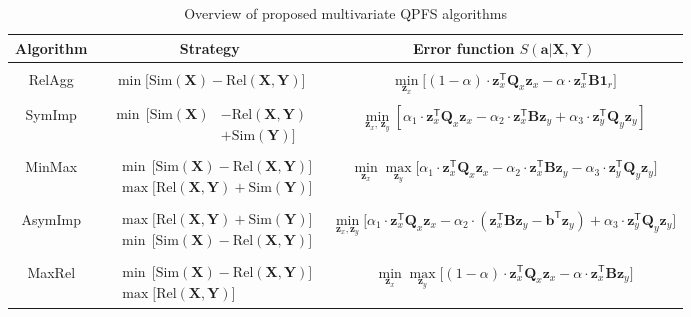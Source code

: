 \documentclass[12pt,oneside]{article}
\theoremstyle{definition}
\newcommand{\ba}{\mathbf{a}}
\newcommand{\bz}{\mathbf{z}}
\newcommand{\bb}{\mathbf{b}}
\newcommand{\bY}{\mathbf{Y}}
\newcommand{\bX}{\mathbf{X}}
\newcommand{\bB}{\mathbf{B}}
\newcommand{\bQ}{\mathbf{Q}}
\newcommand{\T}{\mathsf{T}}
\newcommand{\bOne}{\boldsymbol{1}}
\begin{document}
\begin{table}
	\centering
	\small{
	\begin{tabular}{c|c|c}
		\hline
		Algorithm & Strategy & Error function $S(\ba | \bX, \bY)$ \\
		\hline && \\ [-.5em]
		RelAgg & $\min \bigl[ \text{Sim}(\bX) - \text{Rel}(\bX, \bY) \bigr] $ & $\min\limits_{\bz_x} \bigl[ (1 - \alpha) \cdot \bz_x^{\T} \bQ_x \bz_x - \alpha \cdot \bz_x^{\T} \bB \bOne_r \bigr] $ \\ &&\\[-.5em]
		SymImp & $\begin{aligned} \min \, \bigl[ \text{Sim}(\bX) & - \text{Rel}(\bX, \bY) \\ & + \text{Sim}(\bY) \bigr] \end{aligned}$ & $ \min\limits_{\bz_x, \, \bz_y} \left[ \alpha_1 \cdot \bz_x^{\T} \bQ_x \bz_x - \alpha_2 \cdot \bz_x^{\T} \bB \bz_y + \alpha_3 \cdot \bz_y^{\T} \bQ_y \bz_y \right] $\\ &&\\ [-.5em]
		MinMax & $\begin{aligned} &\min \, \bigl[ \text{Sim}(\bX) - \text{Rel}(\bX, \bY) \bigr]  \\ & \max \bigl[\text{Rel}(\bX, \bY) + \text{Sim}(\bY) \bigr] \end{aligned}$ & $	\min\limits_{\bz_x} 	\max\limits_{\bz_y} \bigl[\alpha_1 \cdot \bz_x^{\T} \bQ_x \bz_x - \alpha_2 \cdot \bz_x^{\T} \bB \bz_y - \alpha_3 \cdot \bz_y^{\T} \bQ_y \bz_y \bigr]$ \\ &&\\ 
		AsymImp & $\begin{aligned} &\max \bigl[\text{Rel}(\bX, \bY) + \text{Sim}(\bY) \bigr] \\ & \min \, \bigl[ \text{Sim}(\bX) - \text{Rel}(\bX, \bY) \bigr]  \end{aligned}$ & $\min\limits_{\bz_x, \bz_y} \bigl[ \alpha_1 \cdot \bz_x^{\T} \bQ_x \bz_x - \alpha_2 \cdot \left(\bz_x^{\T} \bB \bz_y - \bb^{\T} \bz_y \right) + \alpha_3 \cdot \bz_y^{\T} \bQ_y \bz_y \bigr]$\\ &&\\ [-.5em]
		MaxRel & $\begin{aligned} &\min \, \bigl[ \text{Sim}(\bX) - \text{Rel}(\bX, \bY) \bigr]  \\ & \max \bigl[\text{Rel}(\bX, \bY) \bigr] \end{aligned}$& $\min\limits_{\bz_x} 	\max\limits_{\bz_y} \bigl[ (1 - \alpha) \cdot \bz_x^{\T} \bQ_x \bz_x - \alpha \cdot \bz_x^{\T} \bB \bz_y \bigr]$ \\ 
		\hline
	\end{tabular}}
	\caption{Overview of proposed multivariate QPFS algorithms}
	\label{tbl:summary}
\end{table}
\end{document}
